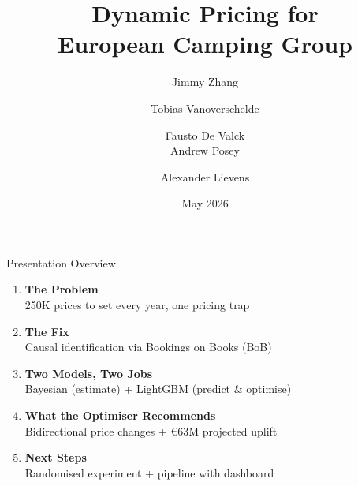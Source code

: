 \documentclass[aspectratio=169]{beamer}
\title{Dynamic Pricing for\\European Camping Group}
\author{Jimmy Zhang \and Tobias Vanoverschelde \and Fausto De Valck\\
        Andrew Posey \and Alexander Lievens}
\institute{KU Leuven · Statistical Consulting 2025--2026 · ORTEC Project}
\date{May 2026}
\begin{document}
\begin{frame}
  \vspace{1.5em}
  \titlepage
\end{frame}

\begin{frame}{Presentation Overview}
\vspace{1em}


\begin{enumerate}\setlength\itemsep{10pt}
  \item {\color{beamerblue}\bfseries The Problem}\\
        {\small\color{darktext} 250K prices to set every year, one pricing trap}

  \item {\color{beamerblue}\bfseries The Fix}\\
        {\small\color{darktext} Causal identification via Bookings on Books (BoB)}

  \item {\color{beamerblue}\bfseries Two Models, Two Jobs}\\
        {\small\color{darktext} Bayesian (estimate) + LightGBM (predict \& optimise)}

  \item {\color{beamerblue}\bfseries What the Optimiser Recommends}\\
        {\small\color{darktext} Bidirectional price changes + \euro63M projected uplift}

  \item {\color{beamerblue}\bfseries Next Steps}\\
        {\small\color{darktext} Randomised experiment + pipeline with dashboard}
\end{enumerate}
\end{frame}
\end{document}
